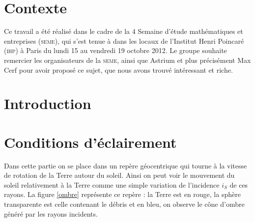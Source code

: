 \documentclass[a4paper,11pt]{article}
\numberwithin{section}{part}
\begin{document}
\section{Contexte}

Ce travail a été réalisé dans le cadre de la 4\ieme{} 
Semaine d'étude mathématiques et entreprises (\textsc{seme}), qui s'est tenue à
dans les locaux de l'Institut Henri Poincaré (\textsc{ihp}) à Paris du lundi 15
au vendredi 19 octobre 2012. Le groupe souhaite remercier les
organisateurs de la \textsc{seme}, ainsi que Astrium et plus précisément Max
Cerf pour avoir proposé ce sujet, que nous avons trouvé intéressant et
riche.




\section{Introduction}









\section{Conditions d'\'eclairement}

Dans cette partie on se place dans un rep\`ere g\'eocentrique qui tourne \`a la vitesse de rotation de la Terre autour du soleil. Ainsi on peut voir le mouvement du soleil relativement \`a la Terre comme une simple variation de l'incidence $i_S$ de ces rayons.  La figure \ref{ombre} repr\'esente ce rep\`ere : la Terre est en rouge, la sph\`ere transparente est celle contenant le d\'ebris et en bleu, on observe le c\^one d'ombre g\'en\'er\'e par les rayons incidents. 
\end{document}
